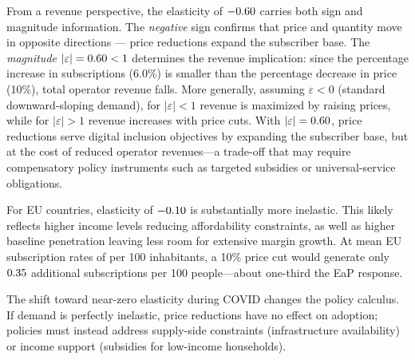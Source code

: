 From a revenue perspective, the elasticity of $-0.60$ carries both sign and magnitude information. The \emph{negative} sign confirms that price and quantity move in opposite directions --- price reductions expand the subscriber base. The \emph{magnitude} $|\varepsilon| = 0.60 < 1$ determines the revenue implication: since the percentage increase in subscriptions (6.0\%) is smaller than the percentage decrease in price (10\%), total operator revenue falls. More generally, assuming $\varepsilon < 0$ (standard downward-sloping demand), for $|\varepsilon| < 1$ revenue is maximized by raising prices, while for $|\varepsilon| > 1$ revenue increases with price cuts. With $|\varepsilon| = 0.60$, price reductions serve digital inclusion objectives by expanding the subscriber base, but at the cost of reduced operator revenues---a trade-off that may require compensatory policy instruments such as targeted subsidies or universal-service obligations.

For EU countries, elasticity of $-0.10$ is substantially more inelastic. This likely reflects higher income levels reducing affordability constraints, as well as higher baseline penetration leaving less room for extensive margin growth. At mean EU subscription rates of \DescSubsEU{} per 100 inhabitants, a 10\% price cut would generate only $0.35$ additional subscriptions per 100 people---about one-third the EaP response.

The shift toward near-zero elasticity during COVID changes the policy calculus. If demand is perfectly inelastic, price reductions have no effect on adoption; policies must instead address supply-side constraints (infrastructure availability) or income support (subsidies for low-income households).
